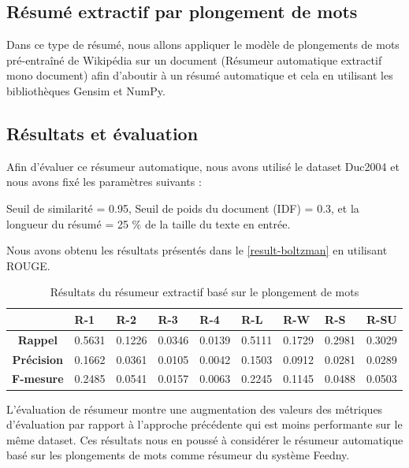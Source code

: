 \subsection{Résumé extractif par plongement de mots}
Dans ce type de résumé, nous allons appliquer le modèle de plongements de mots pré-entraîné de Wikipédia \cite{fasttext} sur un document (Résumeur automatique extractif mono document) \cite{notreresume} afin d'aboutir à un résumé automatique et cela en utilisant les bibliothèques Gensim et NumPy. 

\subsection{Résultats et évaluation}
Afin d'évaluer ce résumeur automatique, nous avons utilisé le dataset Duc2004 et nous avons fixé les paramètres suivants :

Seuil de similarité = 0.95, Seuil de poids du document (IDF) = 0.3, et la longueur du résumé = 25 \% de la taille du texte en entrée.

Nous avons obtenu les résultats présentés dans le \autoref{result-boltzman} en utilisant ROUGE. 

\begin{table}[H]
    \begin{center}
        \begin{tabular}{|c|C{1.2cm}|C{1.2cm}|C{1.2cm}|C{1.2cm}|C{1.2cm}|C{1.2cm}|C{1.2cm}|C{1.2cm}|}
             & \textbf{R-1} &  \textbf{R-2} &  \textbf{R-3} &  \textbf{R-4} &  \textbf{R-L} &  \textbf{R-W} &  \textbf{R-S} &  \textbf{R-SU} \\
            \hline
            \textbf{Rappel} & 0.5631 & 0.1226 & 0.0346 & 0.0139 & 0.5111 & 0.1729 & 0.2981 & 0.3029 \\
            \textbf{Précision} & 0.1662 & 0.0361 & 0.0105 & 0.0042 & 0.1503 & 0.0912 & 0.0281 & 0.0289 \\
            \textbf{F-mesure} & 0.2485 & 0.0541 & 0.0157 & 0.0063 & 0.2245 & 0.1145 & 0.0488 & 0.0503 \\
            \hline
        \end{tabular}
    \end{center}
    \caption{Résultats du résumeur extractif basé sur le plongement de mots}
    \label{result-boltzman}
\end{table}

L'évaluation de résumeur montre une augmentation des valeurs des métriques d'évaluation par rapport à l'approche précédente qui est moins performante sur le même dataset. Ces résultats nous en poussé à considérer le résumeur automatique basé sur les plongements de mots comme résumeur du système \textquotedbl Feedny\textquotedbl.

